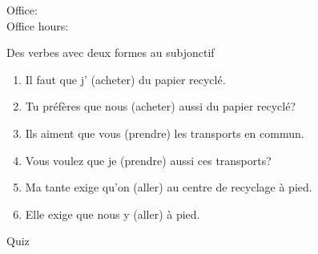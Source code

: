 \documentclass{beamer}
\subtitle[Subjonctif]{Surprise! C'est encore le subjonctif.}
\begin{document}
  \begin{frame}
    \titlepage
    \tiny{Office: \\
          Office hours: }
  \end{frame}

  \begin{frame}{Des verbes avec deux formes au subjonctif}
    \begin{enumerate}
      \item Il faut que j'\underline{} (acheter) du papier recyclé.
      \item Tu préfères que nous \underline{} (acheter) aussi du papier recyclé?
      \item Ils aiment que vous \underline{} (prendre) les transports en commun.
      \item Vous voulez que je \underline{} (prendre) aussi ces transports?
      \item Ma tante exige qu'on \underline{} (aller) au centre de recyclage à pied.
      \item Elle exige que nous y \underline{} (aller) à pied.
    \end{enumerate}
  \end{frame}

  \begin{frame}{}
    \begin{center}
      \Large Quiz
    \end{center}
  \end{frame}
\end{document}
